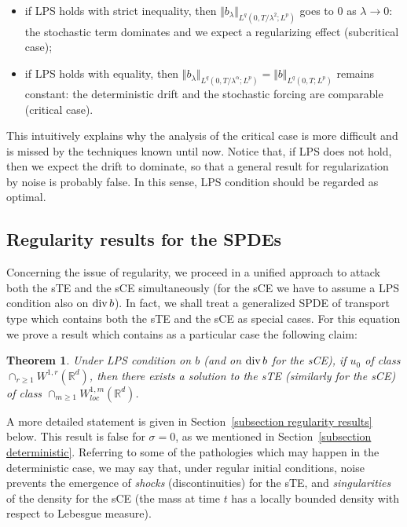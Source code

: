 \documentclass[a4paper,10pt]{article}
\newtheorem{theorem}{Theorem}
\def\func#1{\mathop{\rm #1}}
\begin{document}
\begin{itemize}
\item if LPS holds with strict inequality, then $\Vert b_{\lambda}\Vert
_{L^{q}(0,T/\lambda^{2};L^{p}) }$ goes to $0$ as $\lambda\rightarrow0$: 
the stochastic term dominates and we expect a
regularizing effect (subcritical case);

\item if LPS holds with equality, then $\Vert b_{\lambda}\Vert_{L^{q}(
0,T/\lambda^{\alpha};L^{p}) }=\Vert
b\Vert_{L^{q}(0,T;L^{p}) }$ remains constant: the deterministic
drift and the stochastic forcing are comparable (critical case).
\end{itemize}

This intuitively explains why the analysis of the critical case is more
difficult and is missed by the techniques known until now. Notice that, if
LPS does not hold, then we expect the drift to dominate, so that a general
result for regularization by noise is probably false. In this sense, LPS
condition should be regarded as optimal.

\subsection{Regularity results for the SPDEs\label{intro section regularity}}

Concerning the issue of regularity, we proceed in a unified approach to
attack both the sTE and the sCE simultaneously (for the sCE we have to
assume a LPS condition also on $\func{div}b$). In fact, we shall treat a
generalized SPDE of transport type which contains both the sTE and the sCE
as special cases. For this equation we prove a result which contains as a
particular case the following claim:

\begin{theorem}
Under LPS condition on $b$ (and on $\func{div}b$ for the sCE), if $u_{0}$ of class $\cap_{r\geq1}W^{1,r}(\mathbb{R}^{d})$, then
there exists a solution to the sTE (similarly for the sCE) of class $\cap_{m\geq1}W_{loc}^{1,m}( \mathbb{R}^{d})$.
\end{theorem}

A more detailed statement is given in Section~\ref{subsection regularity
results} below. This result is false for $\sigma =0$, as we mentioned in
Section~\ref{subsection deterministic}. Referring to some of the pathologies
which may happen in the deterministic case, we may say that, under regular
initial conditions, noise prevents the emergence of \textit{shocks}
(discontinuities) for the sTE, and \textit{singularities} of the density for
the sCE (the mass at time $t$ has a locally bounded density with respect to
Lebesgue measure).
\end{document}

